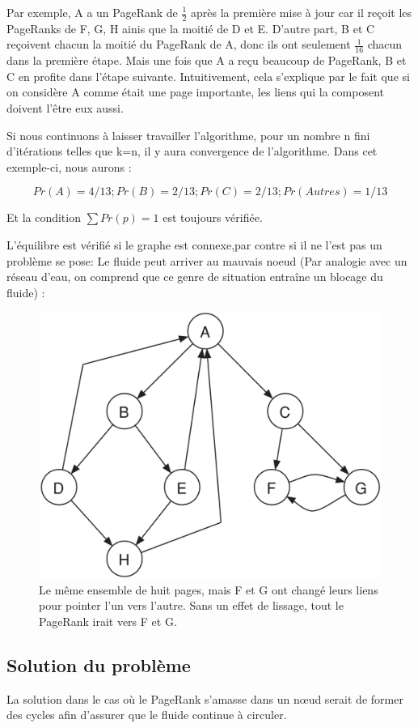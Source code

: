 Par exemple, A a un PageRank de $\frac{1}{2}$ après la première mise à
jour car il reçoit les PageRanks de F, G, H ainis que la moitié de D et
E. D'autre part, B et C reçoivent chacun la moitié du PageRank de A,
donc ils ont seulement $\frac{1}{16}$ chacun dans la première étape.
Mais une fois que A a reçu beaucoup de PageRank, B et C en profite dans
l'étape suivante. Intuitivement, cela s'explique par le fait que si on
considère A comme était une page importante, les liens qui la composent
doivent l'être eux aussi.

 Si nous continuons à laisser travailler l'algorithme, pour un nombre n fini d'itérations telles que k=n, il y aura convergence de l'algorithme. Dans cet exemple-ci,  nous aurons :

	$$Pr(A) = 4/13 ; Pr(B) = 2/13 ; Pr(C) = 2/13 ; Pr(Autres) = 1/13$$
 
Et la condition $\sum Pr(p) = 1$ est toujours vérifiée.
 
 L'équilibre est vérifié si le graphe est connexe,par contre si il ne
 l'est pas un problème se pose: Le fluide peut arriver au mauvais noeud
 (Par analogie avec un réseau d'eau, on comprend que ce genre de
 situation entraîne un blocage du \og{}fluide\fg{}) :

\begin{figure}[!ht]
    \centering
    \includegraphics[width=0.7\linewidth]{images/24_PageRank_non_connexe.png}
    \caption{Le même ensemble de huit pages, mais F et G ont changé
        leurs liens pour pointer l'un vers l'autre. Sans un effet de
    lissage, tout le PageRank irait vers F et G.}
\end{figure}

\subsection*{Solution du problème}
	La solution dans le cas où le PageRank s'amasse dans un nœud serait de former des cycles afin d'assurer que le fluide continue à circuler.

